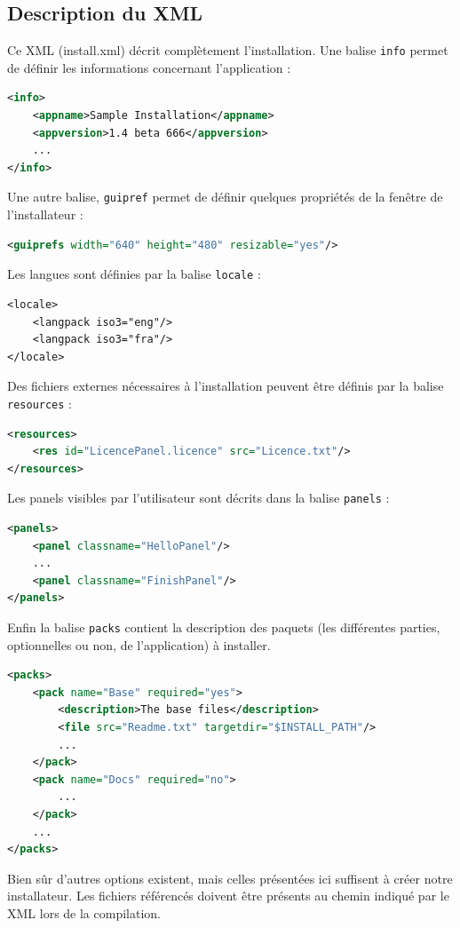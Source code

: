 \subsection{Description du XML}
Ce XML (install.xml) décrit complètement l'installation.
Une balise \verb|info| permet de définir les informations concernant l'application :
\begin{lstlisting}[language=XML]
<info>
	<appname>Sample Installation</appname>
	<appversion>1.4 beta 666</appversion>
	...
</info>
\end{lstlisting}
Une autre balise, \verb|guipref| permet de définir quelques propriétés de la fenêtre de l'installateur :
\begin{lstlisting}[language=XML]
<guiprefs width="640" height="480" resizable="yes"/>
\end{lstlisting}
Les langues sont définies par la balise \verb|locale| :
\begin{lstlisting}
<locale>
	<langpack iso3="eng"/>
	<langpack iso3="fra"/>
</locale>
\end{lstlisting}
Des fichiers externes nécessaires à l'installation peuvent être définis par la balise \verb|resources| :
\begin{lstlisting}[language=XML]
<resources>
	<res id="LicencePanel.licence" src="Licence.txt"/>
</resources>
\end{lstlisting}
Les panels visibles par l'utilisateur sont décrits dans la balise \verb|panels| :
\begin{lstlisting}[language=XML]
<panels>
	<panel classname="HelloPanel"/>
	...
	<panel classname="FinishPanel"/>
</panels>
\end{lstlisting}
Enfin la balise \verb|packs| contient la description des paquets (les différentes parties, optionnelles ou non, de l'application) à installer.
\begin{lstlisting}[language=XML]
<packs>
	<pack name="Base" required="yes">
		<description>The base files</description>
		<file src="Readme.txt" targetdir="$INSTALL_PATH"/>
		...
	</pack>
	<pack name="Docs" required="no">
		...
	</pack>
	...
</packs>
\end{lstlisting}
Bien sûr d'autres options existent, mais celles présentées ici suffisent à créer notre installateur.
Les fichiers référencés doivent être présents au chemin indiqué par le XML lors de la compilation.
